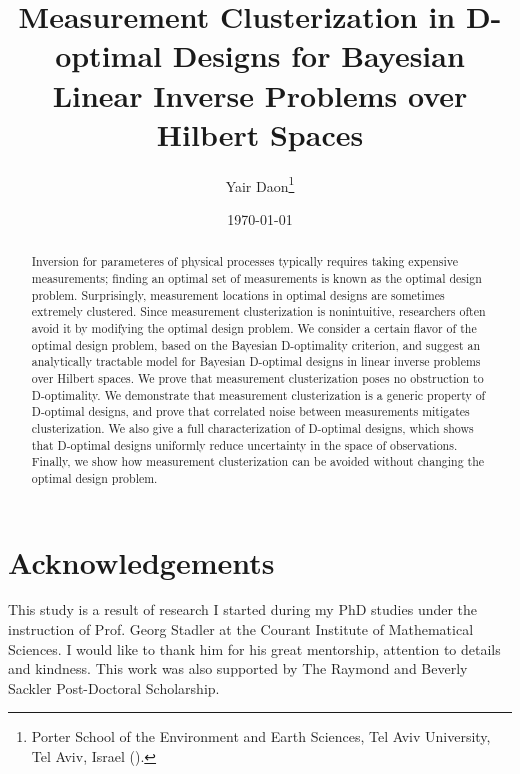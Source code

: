 \documentclass{siamonline220329}
\title{Measurement Clusterization in D-optimal Designs for Bayesian Linear
  Inverse Problems over Hilbert Spaces}
\author{Yair Daon\thanks{Porter School of the Environment and Earth
    Sciences, Tel Aviv University, Tel Aviv, Israel
    (\email{yair.daon@gmail.com}).}}
\date{\today}
\begin{document}
\maketitle
\begin{abstract}
  Inversion for parameteres of physical processes typically requires
  taking expensive measurements; finding an optimal set of
  measurements is known as the optimal design problem. Surprisingly,
  measurement locations in optimal designs are sometimes extremely
  clustered. Since measurement clusterization is nonintuitive,
  researchers often avoid it by modifying the optimal design
  problem. We consider a certain flavor of the optimal design problem,
  based on the Bayesian D-optimality criterion, and suggest an
  analytically tractable model for Bayesian D-optimal designs in
  linear inverse problems over Hilbert spaces. We prove that
  measurement clusterization poses no obstruction to D-optimality. We
  demonstrate that measurement clusterization is a generic property of
  D-optimal designs, and prove that correlated noise between
  measurements mitigates clusterization. We also give a full
  characterization of D-optimal designs, which shows that D-optimal
  designs uniformly reduce uncertainty in the space of
  observations. Finally, we show how measurement clusterization can be
  avoided without changing the optimal design problem.
\end{abstract}




\maketitle










\section{Acknowledgements}
This study is a result of research I started during my PhD studies
under the instruction of Prof. Georg Stadler at the Courant Institute
of Mathematical Sciences. I would like to thank him for his great
mentorship, attention to details and kindness. This work was also
supported by The Raymond and Beverly Sackler Post-Doctoral
Scholarship.
\end{document}
